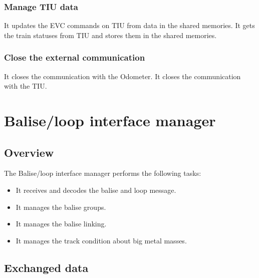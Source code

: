 \documentclass[nocc]{template/openetcs_report}
\begin{document}
\subsection{Manage TIU data}
It updates the EVC commands on TIU from data in the shared memories.
It gets the train statuses from TIU and stores them in the shared memories.
\subsection{Close the external communication}
It closes the communication with the Odometer.
It closes the communication with the TIU.
\chapter{Balise/loop interface manager}
\section{Overview}
The Balise/loop interface manager performs the following tasks:
\begin{itemize}
\item It receives and decodes the balise and loop message.
\item It manages the balise groups.
\item It manages the balise linking.
\item It manages the track condition about big metal masses.
\end{itemize}
\section{Exchanged data}
\end{document}
